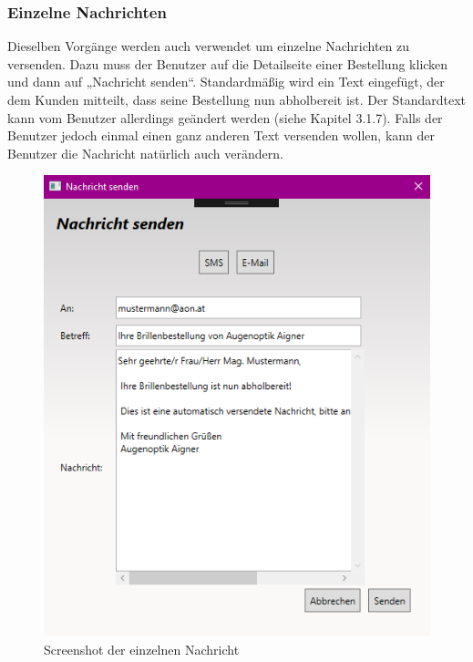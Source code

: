 \subsubsection{Einzelne Nachrichten}
Dieselben Vorgänge werden auch verwendet um einzelne Nachrichten zu versenden. Dazu muss der Benutzer auf die Detailseite einer Bestellung klicken und dann auf „Nachricht senden“. Standardmäßig wird ein Text eingefügt, der dem Kunden mitteilt, dass seine Bestellung nun abholbereit ist. Der Standardtext kann vom Benutzer allerdings geändert werden (siehe Kapitel 3.1.7). Falls der Benutzer jedoch einmal einen ganz anderen Text versenden wollen, kann der Benutzer die Nachricht natürlich auch verändern.
\begin{figure}[H]
\begin{center}
	\includegraphics[scale=.6]{images/EinzelneNachricht.png}
\end{center}
	\caption{Screenshot der einzelnen Nachricht}
	\label{fig:sample}
\end{figure}

